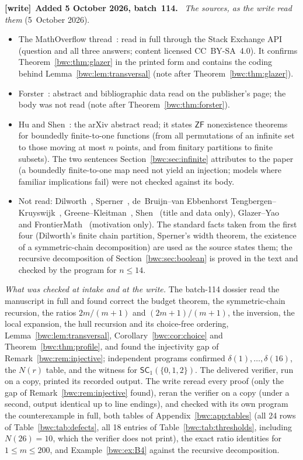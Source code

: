 \documentclass[11pt,letterpaper]{article}
\numberwithin{equation}{section}
\theoremstyle{plain}
\theoremstyle{definition}
\theoremstyle{remark}
\newcommand{\SC}{\mathsf{SC}}
\newcommand{\ZF}{\mathsf{ZF}}
\newenvironment{writenote}[1][]{\par\smallskip\begingroup\small
 \noindent\textbf{[write]}\if\relax\detokenize{#1}\relax\else~\textbf{#1.}\fi\ }%
 {\par\endgroup\smallskip}
\begin{document}
\begin{writenote}[Added 5 October 2026, batch~114]
\emph{The sources, as the write read them} (5~October 2026).
\begin{itemize}\raggedright
\item The MathOverflow thread~\cite{PrussGlazer2025}: read in full through
 the Stack Exchange API (question and all three answers; content licensed
 CC~BY-SA~4.0). It confirms Theorem~\ref{bwc:thm:glazer} in the printed form
 and contains the coding behind Lemma~\ref{bwc:lem:transversal} (note after
 Theorem~\ref{bwc:thm:glazer}).
\item Forster~\cite{Forster2003}: abstract and bibliographic data read on the
 publisher's page; the body was not read (note after
 Theorem~\ref{bwc:thm:forster}).
\item Hu and Shen~\cite{HuShen2025}: the arXiv abstract read; it states $\ZF$
 nonexistence theorems for boundedly finite-to-one functions (from all
 permutations of an infinite set to those moving at most $n$ points, and from
 finitary partitions to finite subsets). The two sentences
 Section~\ref{bwc:sec:infinite} attributes to the paper (a boundedly
 finite-to-one map need not yield an injection; models where familiar
 implications fail) were not checked against its body.
\item Not read: Dilworth~\cite{Dilworth1950}, Sperner~\cite{Sperner1928},
 de~Bruijn--van Ebbenhorst Tengbergen--Kruyswijk~\cite{deBruijn1951},
 Greene--Kleitman~\cite{GreeneKleitman1976}, Shen~\cite{Shen2026} (title and
 data only), Glazer--Yao~\cite{GlazerYao2026} and FrontierMath~\cite{FrontierMath}
 (motivation only). The standard facts taken from the first four (Dilworth's
 finite chain partition, Sperner's width theorem, the existence of a
 symmetric-chain decomposition) are used as the source states them; the
 recursive decomposition of Section~\ref{bwc:sec:boolean} is proved in the
 text and checked by the program for $n\leq14$.
\end{itemize}

\emph{What was checked at intake and at the write.} The batch-114 dossier read
the manuscript in full and found correct the budget theorem, the
symmetric-chain recursion, the ratios $2m/(m+1)$ and $(2m+1)/(m+1)$, the
inversion, the local expansion, the hull recursion and its choice-free
ordering, Lemma~\ref{bwc:lem:transversal}, Corollary~\ref{bwc:cor:choice} and
Theorem~\ref{bwc:thm:profile}, and found the injectivity gap of
Remark~\ref{bwc:rem:injective}; independent programs confirmed $\delta(1),
\dots,\delta(16)$, the $N(r)$ table, and the witness for $\SC_1(\{0,1,2\})$.
The delivered verifier, run on a copy, printed its recorded output. The write
reread every proof (only the gap of Remark~\ref{bwc:rem:injective} found),
reran the verifier on a copy (under a second, output identical up to line
endings), and checked with its own program the counterexample in full, both
tables of Appendix~\ref{bwc:app:tables} (all 24 rows of
Table~\ref{bwc:tab:defects}, all 18 entries of
Table~\ref{bwc:tab:thresholds}, including $N(26)=10$, which the verifier does
not print), the exact ratio identities for $1\leq m\leq200$, and
Example~\ref{bwc:ex:B4} against the recursive decomposition.


\end{writenote}
\end{document}
